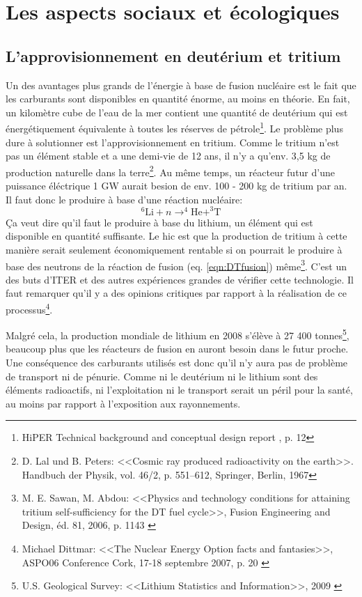 \documentclass[12pt,a4paper]{article}
\begin{document}
\section{Les aspects sociaux et écologiques}
\subsection{L'approvisionnement en deutérium et tritium} \label{dt}
Un des avantages plus grands de l'énergie à base de fusion nucléaire est le fait que les carburants sont disponibles en quantité énorme, au moins en théorie. En fait, un kilomètre cube de l'eau de la mer contient une quantité de deutérium qui est énergétiquement équivalente à toutes les réserves de pétrole\footnote{HiPER Technical background and conceptual design report \cite{hiper}, p. 12}. Le problème plus dure à solutionner est l'approvisionnement en tritium. Comme le tritium n'est pas un élément stable et a une demi-vie de 12 ans, il n'y a qu'env. 3,5 kg de production naturelle dans la terre\footnote{D. Lal und B. Peters: <<Cosmic ray produced radioactivity on the earth>>. Handbuch der Physik, vol. 46/2, p. 551–612, Springer, Berlin, 1967}. Au même temps, un réacteur futur d'une puissance éléctrique 1 GW aurait besion de env. 100 - 200 kg de tritium par an. Il faut donc le produire à base d'une réaction nucléaire:
\begin{equation}
^6 \text{Li} + n \rightarrow ^4 \text{He} + ^3 \text{T}
\end{equation}
Ça veut dire qu'il faut le produire à base du lithium, un élément qui est disponible en quantité suffisante. Le hic est que la production de tritium à cette manière serait seulement économiquement rentable si on pourrait le produire à base des neutrons de la réaction de fusion (eq. \ref{eqn:DTfusion}) même\footnote{M. E. Sawan, M. Abdou: <<Physics and technology conditions for attaining tritium self-sufficiency for the DT fuel cycle>>, Fusion Engineering and Design, éd. 81, 2006, p. 1143 \cite{tritiumself}}. C'est un des buts d'ITER et des autres expériences grandes de vérifier cette technologie. Il faut remarquer qu'il y a des opinions critiques par rapport à la réalisation de ce processus\footnote{Michael Dittmar: <<The Nuclear Energy Option facts and fantasies>>, ASPO06 Conference Cork, 17-18 septembre 2007, p. 20 \cite{dittmar}}.

Malgré cela, la production mondiale de lithium en 2008 s'élève à 27 400 ton\-nes\footnote{U.S. Geological Survey: <<Lithium Statistics and Information>>, 2009 \cite{usgs}}, beaucoup plus que les réacteurs de fusion en auront besoin dans le futur proche. Une conséquence des carburants utilisés est donc qu'il n'y aura pas de problème de transport ni de pénurie. Comme ni le deutérium ni le lithium sont des éléments radioactifs, ni l'exploitation ni le transport serait un péril pour la santé, au moins par rapport à l'exposition aux rayonnements.
\end{document}
